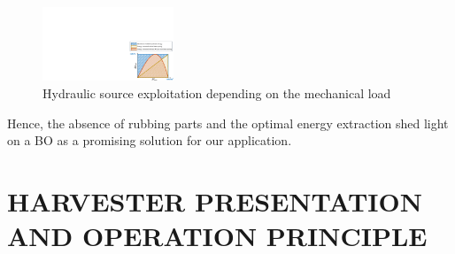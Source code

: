 \documentclass[3p,twocolumn,preprint]{elsarticle}
\begin{document}
\begin{figure}[!htbp]
	\centering
	\captionsetup{justification=centering}
	\includegraphics[trim={22.5cm 0cm 0cm 8.8cm},clip, width=0.35\textwidth]{figures/OB_vs_LINEAR.pdf}
	\caption{Hydraulic source exploitation depending on the mechanical load}
	\label{fig:OB_vs_LINEAR}
\end{figure}
Hence, the absence of rubbing parts and the optimal energy extraction shed light on a BO as a promising solution for our application. 
\section{HARVESTER PRESENTATION AND OPERATION \mbox{PRINCIPLE}}
\label{sec:HARVESTER PRESENTATION AND OPERATION PRINCIPLE}
\end{document}
